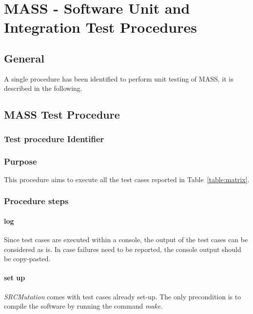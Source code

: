 
\chapter{MASS - Software Unit and Integration Test Procedures}

\section{General}

A single procedure has been identified to perform unit testing of MASS, it is described in the following.

\section{MASS Test Procedure}

\subsection{Test procedure Identifier}




\subsection{Purpose}

This procedure aims to execute all the test cases reported in Table~\ref{table:matrix}.

\subsection{Procedure steps}

\subsubsection{log}
Since test cases are executed within a console, the output of the test cases can be considered as is. 
In case failures need to be reported, the console output should be copy-pasted.
\subsubsection{set up}
\emph{SRCMutation} comes with test cases already set-up. The only precondition is to compile the software by running the command \emph{make}.
